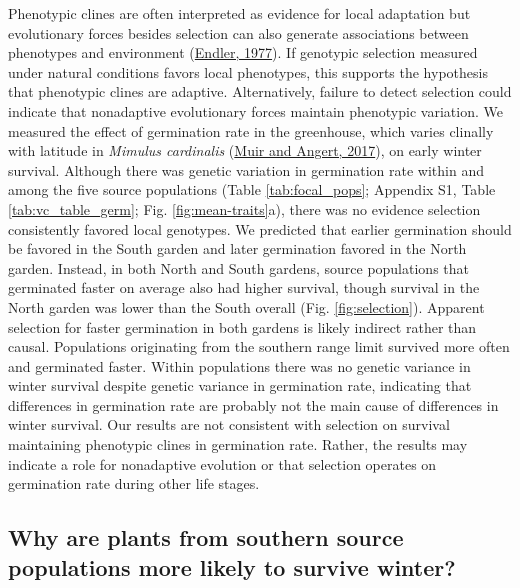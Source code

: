 \documentclass[
  12pt,
]{article}
\begin{document}
Phenotypic clines are often interpreted as evidence for local adaptation but evolutionary forces besides selection can also generate associations between phenotypes and environment (\protect\hyperlink{ref-endler_geographic_1977}{Endler, 1977}). If genotypic selection measured under natural conditions favors local phenotypes, this supports the hypothesis that phenotypic clines are adaptive. Alternatively, failure to detect selection could indicate that nonadaptive evolutionary forces maintain phenotypic variation. We measured the effect of germination rate in the greenhouse, which varies clinally with latitude in \emph{Mimulus cardinalis} (\protect\hyperlink{ref-muir_grow_2017}{Muir and Angert, 2017}), on early winter survival. Although there was genetic variation in germination rate within and among the five source populations (Table \ref{tab:focal_pops}; Appendix S1, Table \ref{tab:vc_table_germ}; Fig. \ref{fig:mean-traits}a), there was no evidence selection consistently favored local genotypes. We predicted that earlier germination should be favored in the South garden and later germination favored in the North garden. Instead, in both North and South gardens, source populations that germinated faster on average also had higher survival, though survival in the North garden was lower than the South overall (Fig. \ref{fig:selection}). Apparent selection for faster germination in both gardens is likely indirect rather than causal. Populations originating from the southern range limit survived more often and germinated faster. Within populations there was no genetic variance in winter survival despite genetic variance in germination rate, indicating that differences in germination rate are probably not the main cause of differences in winter survival. Our results are not consistent with selection on survival maintaining phenotypic clines in germination rate. Rather, the results may indicate a role for nonadaptive evolution or that selection operates on germination rate during other life stages.

\hypertarget{why-are-plants-from-southern-source-populations-more-likely-to-survive-winter}{%
\subsection{Why are plants from southern source populations more likely to survive winter?}\label{why-are-plants-from-southern-source-populations-more-likely-to-survive-winter}}
\end{document}
